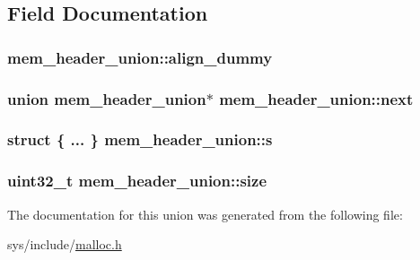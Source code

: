 \subsection{Field Documentation}
\hypertarget{unionmem__header__union_a5ca4f0da25cd2b76029162df7bdb537c}{
\subsubsection[{align\-\_\-dummy}]{ mem\-\_\-header\-\_\-union\-::align\-\_\-dummy}}\label{unionmem__header__union_a5ca4f0da25cd2b76029162df7bdb537c}
\hypertarget{unionmem__header__union_a22eb41be35488312c1e42462d5679d64}{
\subsubsection[{next}]{\setlength{\rightskip}{0pt plus 5cm}union {\bf mem\-\_\-header\-\_\-union}$\ast$ mem\-\_\-header\-\_\-union\-::next}}\label{unionmem__header__union_a22eb41be35488312c1e42462d5679d64}
\hypertarget{unionmem__header__union_a8e9bc77f2cf7596a7503f50ef29019f9}{
\subsubsection[{s}]{\setlength{\rightskip}{0pt plus 5cm}struct \{ ... \}   mem\-\_\-header\-\_\-union\-::s}}\label{unionmem__header__union_a8e9bc77f2cf7596a7503f50ef29019f9}
\hypertarget{unionmem__header__union_ab0a6578a8d52fd76a933d21273e73e08}{
\subsubsection[{size}]{\setlength{\rightskip}{0pt plus 5cm}uint32\-\_\-t mem\-\_\-header\-\_\-union\-::size}}\label{unionmem__header__union_ab0a6578a8d52fd76a933d21273e73e08}


The documentation for this union was generated from the following file\-:\begin{DoxyCompactItemize}
\item 
sys/include/\hyperlink{malloc_8h}{malloc.\-h}\end{DoxyCompactItemize}
